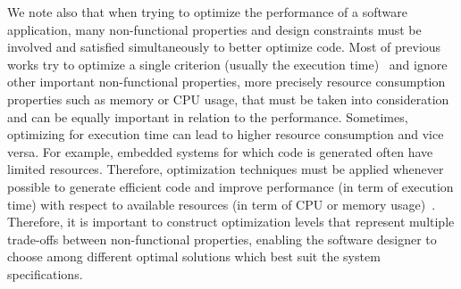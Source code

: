 We note also that when trying to optimize the performance of a software application,
many non-functional properties and design constraints must be involved and satisfied simultaneously to better optimize code.
Most of previous works try to optimize a single criterion (usually the execution time)~\cite{ballal2015compiler,chen2012deconstructing,demertzi2011analyzing} and ignore other important non-functional properties, more precisely resource consumption properties such as memory or CPU usage, that must be taken into consideration and can be equally important in relation to the performance. Sometimes, optimizing for execution time can lead to higher resource consumption and vice versa. For example, embedded systems for which code is generated often have limited resources. Therefore, optimization techniques must be applied whenever possible to generate efficient code and improve performance (in term of execution time) with respect to available resources (in term of CPU or memory usage)~\cite{nagiub2013automatic}.
Therefore, it is important to construct optimization levels that represent multiple trade-offs between non-functional properties, enabling the software designer to choose among different optimal solutions which best suit the system specifications.




 

